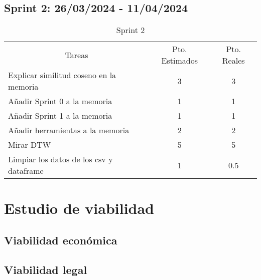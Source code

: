 \subsection{Sprint 2: 26/03/2024 - 11/04/2024}
\begin{table}[H]
	\begin{tabular}{lcc}
		\multicolumn{1}{c}{Tareas} & Pto. Estimados & Pto. Reales\\
		Explicar similitud coseno en la memoria & 3 & 3 \\
		Añadir Sprint 0 a la memoria & 1 & 1 \\
		Añadir Sprint 1 a la memoria & 1 & 1 \\
		Añadir herramientas a la memoria & 2 & 2 \\
		Mirar DTW & 5 & 5 \\
		Limpiar los datos de los csv y dataframe & 1 & 0.5 \\

	\end{tabular}
	\caption{Sprint 2}
	\label{sprint2}
\end{table}

\section{Estudio de viabilidad}

\subsection{Viabilidad económica}

\subsection{Viabilidad legal}


